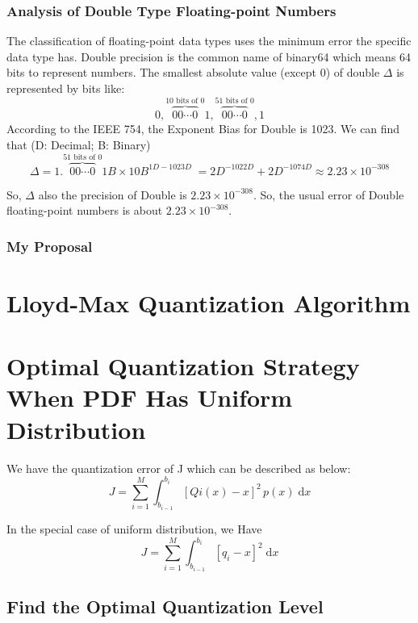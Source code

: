 \documentclass{article}
\begin{document}
\subsubsection{Analysis of Double Type Floating-point Numbers}
The classification of floating-point data types uses the minimum error the specific data type has. Double precision is the common name of binary64 which means 64 bits to represent numbers.
The smallest absolute value (except $0$) of double $\Delta$ is represented by bits like:
$$
0,\overbrace{00\cdots0}^{10 \text{ bits of } 0}1,\overbrace{00\cdots0}^{51 \text{ bits of } 0},1
$$
According to the IEEE 754, the Exponent Bias for Double is 1023. We can find that (D: Decimal; B: Binary)
 $$\Delta = 1.\overbrace{00\cdots0}^{51 \text{ bits of } 0}1B \times 10B^{1D-1023D} \; = 2D^{-1022D} + 2D^{-1074D}  \approx 2.23 \times 10^{-308}$$

 So, $\Delta$ also the precision of Double is $2.23 \times 10^{-308}$. So, the usual error of Double floating-point numbers is about $2.23 \times 10^{-308}$.

\subsubsection{My Proposal}


\section{Lloyd-Max Quantization Algorithm}

\section{Optimal Quantization Strategy When PDF Has Uniform Distribution}
We have the quantization error of J which can be described as below:
\begin{equation}
J = \sum_{i = 1}^{M}  \int_{b_{i - 1}}^{b_i} [Qi(x) - x]^2 \, p(x) \; \mathrm{d}x
\end{equation}

In the special case of uniform distribution, we Have
\begin{equation}
J = \sum_{i = 1}^{M}  \int_{b_{i - 1}}^{b_i} [q_i - x]^2 \; \mathrm{d}x
\label{eq:label}
\end{equation}

\subsection{Find the Optimal Quantization Level}
\end{document}
